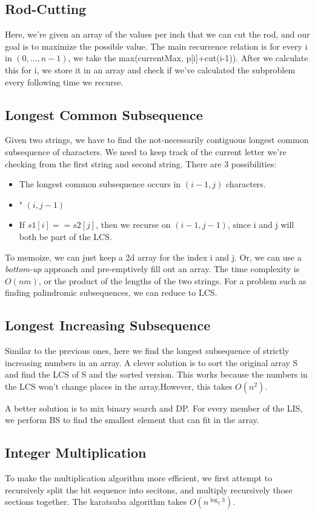 \documentclass[portrait,10pt, a4paper]{article}
\begin{document}
\begin{multicols*}{3}
	\subsection{Rod-Cutting}
		Here, we're given an array of the values per inch that we can cut the rod, and our goal is to maximize the possible
		value.  The main recurrence relation is for every i in $(0,...,n-1)$, we take the max(currentMax, p[i]+cut(i-1)). After we
		calculate this for i, we store it in an array and check if we've calculated the subproblem every following time we 
		recurse.
	\subsection{Longest Common Subsequence}
		Given two strings, we have to find the not-necessarily contiguous longest common subsequence of characters. We need to 
		keep track of the current letter we're checking from the first string and second string. There are 3 possibilities:
		\begin{itemize}
				\item{The longest common subsequence occurs in $(i-1, j)$ characters.}
				\item{" $(i,j-1)$}
				\item{If $s1[i]==s2[j]$, then we recurse on $(i-1, j-1)$, since i and j will both be part of the LCS.}
		\end{itemize}

		To memoize, we can just keep a 2d array for the index i and j. Or, we can use a \textit{bottom-up} approach and 
		pre-emptively fill out an array. The time complexity is $O(nm)$, or the product of the lengths of the two strings. For a 
		problem such as finding palindromic subsequences, we can reduce to LCS.
		
	\subsection{Longest Increasing Subsequence}
		Similar to the previous ones, here we find the longest subsequence of strictly increasing numbers in an array. A clever
		solution is to sort the original array S and find the LCS of S and the sorted version. This works because the numbers in the
		LCS won't change places in the array.However, this takes $O(n^{2})$. 

		A better solution is to mix binary search and DP. For every member of the LIS, we perform  BS to find the smallest element
		that can fit in the array.
	\subsection{Integer Multiplication}
		To make the multiplication algorithm more efficient, we first attempt to recursively split the bit sequence into 
		secitons, and multiply recursively those sections together. The karatsuba algorithm takes $O(n^{\log_{2}3})$.

\end{multicols*}
\end{document}
